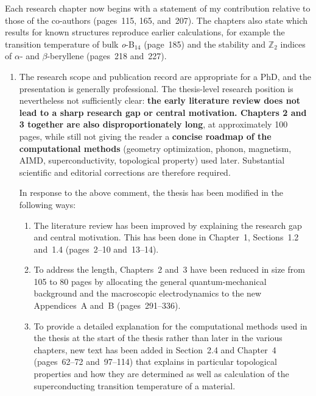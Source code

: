 \documentclass[12pt,a4paper]{article}
\newenvironment{reply}{\par\medskip\color{replyblue}}{\par\medskip}
\begin{document}
\begin{reply}
Each research chapter now begins with a statement of my contribution relative to those of the co-authors (pages~115, 165, and~207).
The chapters also state which results for known structures reproduce earlier calculations, for example the transition temperature of bulk \textit{o}-B$_{14}$ (page~185) and the stability and $\mathbb{Z}_2$ indices of $\alpha$- and $\beta$-beryllene (pages~218 and~227).
\end{reply}

\begin{enumerate}[leftmargin=*]

\item The research scope and publication record are appropriate for a PhD, and the presentation is generally professional. The thesis-level research position is nevertheless not sufficiently clear: \textbf{the early literature review does not lead to a sharp research gap or central motivation. Chapters 2 and 3 together are also disproportionately long}, at approximately 100 pages, while still not giving the reader a \textbf{concise roadmap of the computational methods} (geometry optimization, phonon, magnetism, AIMD, superconductivity, topological property) used later. Substantial scientific and editorial corrections are therefore required.

\begin{reply}
In response to the above comment, the thesis has been modified in the following ways:
\begin{enumerate}[label=(\roman*),leftmargin=*]
\item The literature review has been improved by explaining the research gap and central motivation.
This has been done in Chapter~1, Sections~1.2 and~1.4 (pages~2--10 and~13--14).
\item To address the length, Chapters~2 and~3 have been reduced in size from 105 to 80 pages by allocating the general quantum-mechanical background and the macroscopic electrodynamics to the new Appendices~A and~B (pages~291--336).
\item To provide a detailed explanation for the computational methods used in the thesis at the start of the thesis rather than later in the various chapters, new text has been added in Section~2.4 and Chapter~4 (pages~62--72 and~97--114) that explains in particular topological properties and how they are determined as well as calculation of the superconducting transition temperature of a material.
\end{enumerate}
\end{reply}


\end{enumerate}
\end{document}
